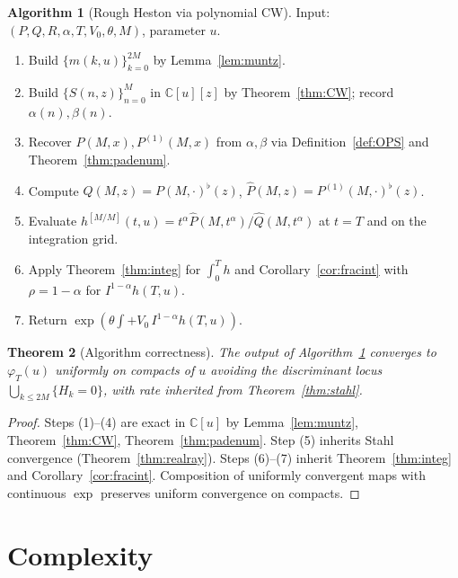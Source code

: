 \documentclass[11pt]{article}
\newtheorem{theorem}{Theorem}[section]
\theoremstyle{definition}
\newtheorem{algorithm}[theorem]{Algorithm}
\begin{document}
\begin{algorithm}[Rough Heston via polynomial CW]\label{alg:rH}
Input: $(P,Q,R,\alpha,T,V_{0},\theta,M)$, parameter $u$.
\begin{enumerate}[label=(\arabic*),leftmargin=*]
  \item Build $\{m(k,u)\}_{k=0}^{2M}$ by Lemma~\ref{lem:muntz}.
  \item Build $\{S(n,z)\}_{n=0}^{M}$ in $\mathbb{C}[u][z]$ by
        Theorem~\ref{thm:CW}; record $\alpha(n),\beta(n)$.
  \item Recover $P(M,x), P^{(1)}(M,x)$ from $\alpha,\beta$ via
        Definition~\ref{def:OPS} and Theorem~\ref{thm:padenum}.
  \item Compute $\hat Q(M,z) = P(M,\cdot)^{\flat}(z)$,
        $\hat P(M,z) = P^{(1)}(M,\cdot)^{\flat}(z)$.
  \item Evaluate $h^{[M/M]}(t,u) = t^{\alpha} \hat P(M,t^{\alpha})/\hat Q(M,t^{\alpha})$
        at $t=T$ and on the integration grid.
  \item Apply Theorem~\ref{thm:integ} for $\int_{0}^{T} h$ and
        Corollary~\ref{cor:fracint} with $\rho = 1-\alpha$ for
        $I^{1-\alpha} h(T,u)$.
  \item Return $\exp(\theta \int + V_{0}\, I^{1-\alpha} h(T,u))$.
\end{enumerate}
\end{algorithm}

\begin{theorem}[Algorithm correctness]\label{thm:algcorr}
The output of Algorithm~\ref{alg:rH} converges to $\varphi_{T}(u)$
uniformly on compacts of $u$ avoiding the discriminant locus
$\bigcup_{k\leq 2M}\{H_{k}=0\}$, with rate inherited from
Theorem~\ref{thm:stahl}.
\end{theorem}

\begin{proof}
Steps (1)--(4) are exact in $\mathbb{C}[u]$ by Lemma~\ref{lem:muntz},
Theorem~\ref{thm:CW}, Theorem~\ref{thm:padenum}. Step (5) inherits
Stahl convergence (Theorem~\ref{thm:realray}). Steps (6)--(7) inherit
Theorem~\ref{thm:integ} and Corollary~\ref{cor:fracint}. Composition
of uniformly convergent maps with continuous $\exp$ preserves uniform
convergence on compacts.
\end{proof}

\section{Complexity}
\end{document}
